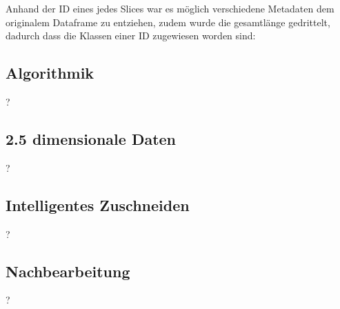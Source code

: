 Anhand der ID eines jedes Slices war es möglich verschiedene Metadaten dem originalem Dataframe zu entziehen, zudem wurde die gesamtlänge gedrittelt, dadurch dass die Klassen einer ID  zugewiesen worden sind: 

\begin{table}[]
 \begin{center}
   \caption{Metadaten für drei slices}\label{tabelle_meta_daten}
 \end{center}
\end{table}



\subsection{Algorithmik}
?

\subsection{2.5 dimensionale Daten}
?

\subsection{Intelligentes Zuschneiden}
?

\subsection{Nachbearbeitung }
?

